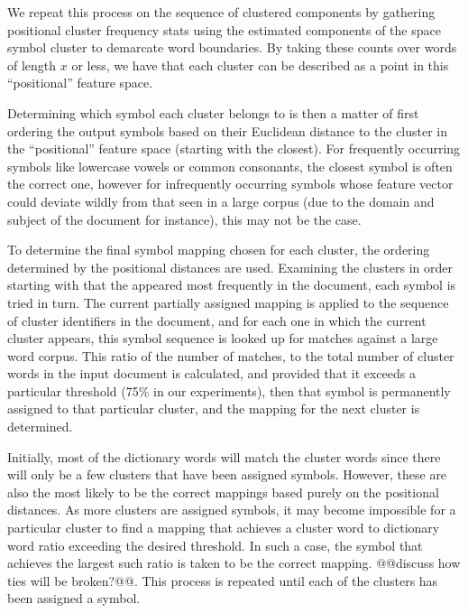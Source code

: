 \documentclass[times, 10pt,twocolumn]{article}
\begin{document}
We repeat this process on the sequence of clustered components by gathering 
positional cluster frequency stats using the estimated components of the space 
symbol cluster to demarcate word boundaries.  By taking these counts over words
of length $x$ or less, we have that each cluster can be described as a point in
this ``positional'' feature space.

Determining which symbol each cluster belongs to is then a matter of first
ordering the output symbols based on their Euclidean distance to the cluster in
the ``positional'' feature space (starting with the closest).  For frequently
occurring symbols like lowercase vowels or common consonants, the closest
symbol is often the correct one, however for infrequently occurring symbols
whose feature vector could deviate wildly from that seen in a large corpus (due
to the domain and subject of the document for instance), this may not be the
case.

To determine the final symbol mapping chosen for each cluster, the ordering
determined by the positional distances are used.  Examining the clusters in
order starting with that the appeared most frequently in the document, each
symbol is tried in turn.  The current partially assigned mapping is applied to
the sequence of cluster identifiers in the document, and for each one in which
the current cluster appears, this symbol sequence is looked up for matches
against a large word corpus.  This ratio of the number of matches, to the total
number of cluster words in the input document is calculated, and provided that
it exceeds a particular threshold (75\% in our experiments), then that symbol
is permanently assigned to that particular cluster, and the mapping for the
next cluster is determined.

Initially, most of the dictionary words will match the cluster words since there
will only be a few clusters that have been assigned symbols.  However, these 
are also the most likely to be the correct mappings based purely on the
positional distances.  As more clusters are assigned symbols, it may become
impossible for a particular cluster to find a mapping that achieves a cluster
word to dictionary word ratio exceeding the desired threshold.  In such a case,
the symbol that achieves the largest such ratio is taken to be the correct
mapping.  @@discuss how ties will be broken?@@.  This process is repeated until
each of the clusters has been assigned a symbol.


\end{document}
